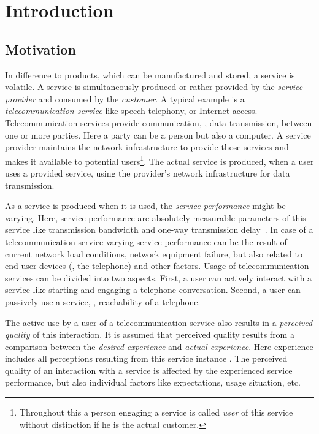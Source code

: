 \chapter{Introduction}\label{chap:01}

\section{Motivation}
In difference to products, which can be manufactured and stored, a service is volatile.
A service is simultaneously produced or rather provided by the \emph{service provider} and consumed by the \emph{customer}.
A typical example is a \emph{telecommunication service} like speech telephony, or Internet access.
Telecommunication services provide communication, \ie, data transmission, between one or more parties.
Here a party can be a person but also a computer.
A service provider maintains the network infrastructure to provide those services and makes it available to potential users\footnote{Throughout this a person engaging a service is called \emph{user} of this service without distinction if he is the actual customer.}.
The actual service is produced, when a user uses a provided service, using the provider's network infrastructure for data transmission.

As a service is produced when it is used, the \emph{service performance} might be varying.
Here, service performance are absolutely measurable parameters of this service like transmission bandwidth and one-way transmission delay~\citep[\cf,][p.~12]{moller_assessment_2000}.
In case of a telecommunication service varying service performance can be the result of current network load conditions, network equipment failure, but also related to end-user devices (\eg, the telephone) and other factors.
Usage of telecommunication services can be divided into two aspects.
First, a user can actively interact with a service like starting and engaging a telephone conversation.
Second, a user can passively use a service, \eg, reachability of a telephone.

The active use by a user of a telecommunication service also results in a \emph{perceived quality} of this interaction.
It is assumed that perceived quality results from a comparison between the \emph{desired experience} and \emph{actual experience}. %
Here experience includes all perceptions resulting from this service instance \citep[\cf,][p.13]{raake_quality_2014}.
The perceived quality of an interaction with a service is affected by the experienced service performance, but also individual factors like expectations, usage situation, etc.

